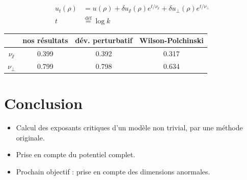\documentclass[xcolor=dvipsnames]{beamer}
\newcommand{\define}{\ensuremath{ \overset{\text{déf}}{=} }}
\begin{document}
\begin{frame}
\begin{columns}
\end{columns}

\[
\begin{aligned}
u_t(\rho)  &= u(\rho) + \delta u_\sslash(\rho) e^{t/\nu_\sslash} + \delta u_\perp(\rho) e^{t/\nu_\perp} \\
t &\define \log k
\end{aligned}
\]

\begin{center}
\label{tab:results}
\begin{tabular}{|c|c|c|c|}
\hline 
\rule[-1ex]{0pt}{2.5ex} ~ & nos résultats & dév. perturbatif & Wilson-Polchinski \\ 
\hline 
\rule[-1ex]{0pt}{2.5ex} $\nu_\sslash$ & 0.399 & 0.392 & 0.317 \\ 
\hline 
\rule[-1ex]{0pt}{2.5ex} $\nu_\perp$ & 0.799 & 0.798 & 0.634 \\ 
\hline 
\end{tabular} 
\end{center}


\end{frame}

\section{Conclusion}
\begin{frame}

\begin{itemize}
\item Calcul des exposants critiques d'un modèle non trivial, par une méthode originale.
\item Prise en compte du potentiel complet.
\item Prochain objectif : prise en compte des dimensions anormales.
\end{itemize}

\end{frame}
\end{document}
